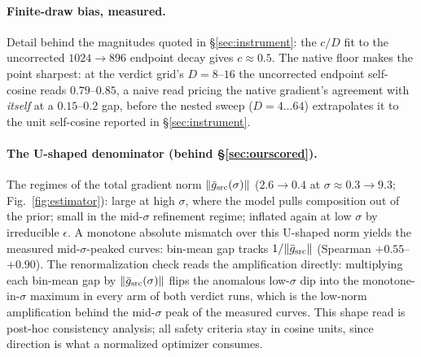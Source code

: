 \paragraph{Finite-draw bias, measured.} Detail behind the magnitudes
quoted in \S\ref{sec:instrument}: the $c/D$ fit to the uncorrected
$1024{\to}896$ endpoint decay gives $c \approx 0.5$. The native
floor makes the point sharpest: at the verdict grid's $D{=}8$--$16$
the uncorrected endpoint self-cosine reads $0.79$--$0.85$, a naive
read pricing the native gradient's agreement with \emph{itself} at a
$0.15$--$0.2$ gap, before the nested sweep ($D = 4 \ldots 64$)
extrapolates it to the unit self-cosine reported in
\S\ref{sec:instrument}.

\paragraph{The U-shaped denominator (behind \S\ref{sec:ourscored}).}
The regimes of the total gradient norm $\|\bar g_{\mathrm{src}}(\sigma)\|$
($2.6 \to 0.4$ at $\sigma\!\approx\!0.3 \to 9.3$;
Fig.~\ref{fig:estimator}): large at high $\sigma$, where the model
pulls composition out of the prior; small in the mid-$\sigma$
refinement regime; inflated again at low $\sigma$ by irreducible
$\epsilon$. A monotone absolute mismatch over this U-shaped norm
yields the measured mid-$\sigma$-peaked curves: bin-mean gap
tracks $1/\|\bar g_{\mathrm{src}}\|$ (Spearman $+0.55$--$+0.90$). The
renormalization check reads the amplification
directly: multiplying each bin-mean gap by
$\|\bar g_{\mathrm{src}}(\sigma)\|$ flips the anomalous low-$\sigma$ dip into
the monotone-in-$\sigma$ maximum in every arm of both verdict runs,
which is the low-norm amplification behind the mid-$\sigma$ peak of the
measured curves. This shape read is post-hoc consistency analysis;
all safety criteria stay in cosine units, since direction is what a
normalized optimizer consumes.

